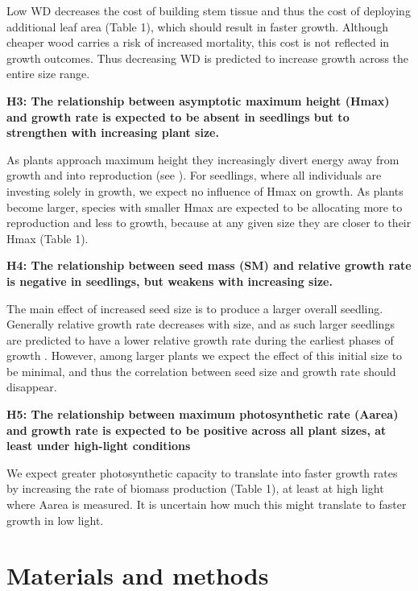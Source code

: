 \documentclass[a4paper]{article}\usepackage[]{graphicx}\usepackage[]{color}
\begin{document}
Low WD decreases the cost of building stem tissue and thus the cost of deploying additional leaf area (Table 1), which should result in faster growth. Although cheaper wood carries a risk of increased mortality, this cost is not reflected in growth outcomes. Thus decreasing WD is predicted to increase growth across the entire size range. 

\textbf{H3: The relationship between asymptotic maximum height (Hmax) and growth rate is expected to be absent in seedlings but to strengthen with increasing plant size.}

As plants approach maximum height they increasingly divert energy away from growth and into reproduction (see \citealt{Thomas:1996do, Falster:2011ii, Wenk:2014jz}). For seedlings, where all individuals are investing solely in growth, we expect no influence of Hmax on growth. As plants become larger, species with smaller Hmax are expected to be allocating more to reproduction and less to growth, because at any given size they are closer to their Hmax (Table 1). 

\textbf{H4: The relationship between seed mass (SM) and relative growth rate is negative in seedlings, but weakens with increasing size.}

The main effect of increased seed size is to produce a larger overall seedling. Generally relative growth rate decreases with size, and as such larger seedlings are predicted to have a lower relative growth rate during the earliest phases of growth \citet{Turnbull:2012ew}. However, among larger plants we expect the effect of this initial size to be minimal, and thus the correlation between seed size and growth rate should disappear.

\textbf{H5: The relationship between maximum photosynthetic rate (Aarea) and growth rate is expected to be positive across all plant sizes, at least under high-light conditions}

We expect greater photosynthetic capacity to translate into faster growth rates by increasing the rate of biomass production (Table 1), at least at high light where Aarea is measured. It is uncertain how much this might translate to faster growth in low light.

\section*{Materials and methods}\label{material-and-methods}
\end{document}
